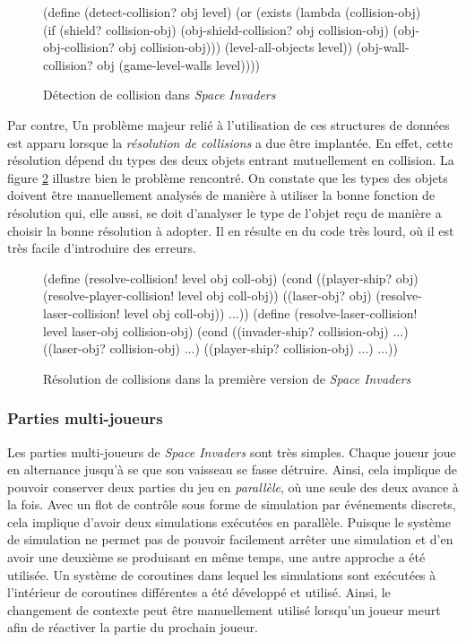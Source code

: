 \documentclass[12pt,oneside,letterpaper,francais]{book}
\newcommand{\si}{{\textit{Space Invaders }}}
\begin{document}
\begin{figure}[htb!]
  \begin{schemecode}
(define (detect-collision? obj level)
  (or (exists (lambda (collision-obj)
                (if (shield? collision-obj)
                    (obj-shield-collision? obj collision-obj)
                    (obj-obj-collision? obj collision-obj)))
              (level-all-objects level))
      (obj-wall-collision? obj (game-level-walls level))))
  \end{schemecode}
  \caption{Détection de collision dans \si}
  \label{Exp:dc-si1}
\end{figure}

Par contre, Un problème majeur relié à l'utilisation de ces structures
de données est apparu lorsque la \emph{résolution de collisions} a due
être implantée. En effet, cette résolution dépend du types des deux
objets entrant mutuellement en collision. La figure
\ref{Exp:si1-col-res} illustre bien le problème rencontré. On constate
que les types des objets doivent être manuellement analysés de manière
à utiliser la bonne fonction de résolution qui, elle aussi, se doit
d'analyser le type de l'objet reçu de manière a choisir la bonne
résolution à adopter. Il en résulte en du code très lourd, où il est
très facile d'introduire des erreurs.

\begin{figure}[htb!]
  \begin{schemecode}
(define (resolve-collision! level obj coll-obj)
  (cond
   ((player-ship? obj) (resolve-player-collision! level obj coll-obj))
   ((laser-obj? obj) (resolve-laser-collision! level obj coll-obj))
   ...))
(define (resolve-laser-collision! level laser-obj collision-obj)
  (cond ((invader-ship? collision-obj) ...)
        ((laser-obj? collision-obj) ...)
        ((player-ship? collision-obj) ...)
        ...))
  \end{schemecode}
  \caption{Résolution de collisions dans la première version de \si}
  \label{Exp:si1-col-res}
\end{figure}

\subsubsection{Parties multi-joueurs}

Les parties multi-joueurs de \si sont très simples. Chaque joueur joue
en alternance jusqu'à se que son vaisseau se fasse détruire. Ainsi,
cela implique de pouvoir conserver deux parties du jeu en
\emph{parallèle}, où une seule des deux avance à la fois. Avec un flot
de contrôle sous forme de simulation par événements discrets, cela
implique d'avoir deux simulations exécutées en parallèle. Puisque le
système de simulation ne permet pas de pouvoir facilement arrêter une
simulation et d'en avoir une deuxième se produisant en même temps, une
autre approche a été utilisée. Un système de coroutines dans lequel
les simulations sont exécutées à l'intérieur de coroutines différentes
a été développé et utilisé. Ainsi, le changement de contexte peut être
manuellement utilisé lorsqu'un joueur meurt afin de réactiver la
partie du prochain joueur.
\end{document}
